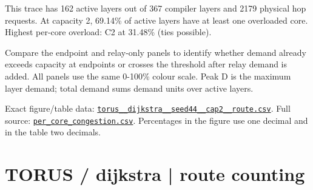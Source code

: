 \documentclass[10pt,a4paper]{article}
\begin{document}
This trace has 162 active layers out of 367 compiler layers and 2179 physical hop requests. At capacity 2, 69.14\% of active layers have at least one overloaded core. Highest per-core overload: C2 at 31.48\% (ties possible).\par
Compare the endpoint and relay-only panels to identify whether demand already exceeds capacity at endpoints or crosses the threshold after relay demand is added. All panels use the same 0-100\% colour scale. Peak D is the maximum layer demand; total demand sums demand units over active layers.\par
Exact figure/table data: \href{\detokenize{file:///home/dhruv-pansuriya/Documents/BTP/Compiler-Driven-ACE/output/pdf/qaoa_methods_congestion/tables/torus__dijkstra__seed44__cap2__route.csv}}{\nolinkurl{torus__dijkstra__seed44__cap2__route.csv}}. Full source: \href{\detokenize{file:///home/dhruv-pansuriya/Documents/BTP/Compiler-Driven-ACE/results/qaoa_2seed_2026-10-26/congestion/per_core_congestion.csv}}{\nolinkurl{per_core_congestion.csv}}. Percentages in the figure use one decimal and in the table two decimals.\par
\clearpage
\section*{TORUS / dijkstra | route counting}
\end{document}
